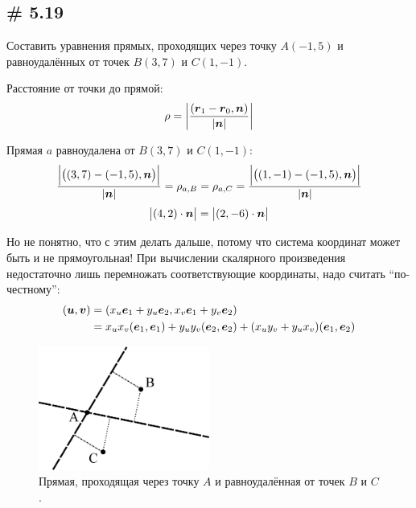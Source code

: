 \documentclass[a4paper,12pt]{article}
\begin{document}
  
  \subsection{\# 5.19}
  
  \begin{problem}
    Составить уравнения прямых, проходящих через точку $A(-1, 5)$ и равноудалённых от точек $B(3, 7)$ и $C(1, -1)$.
  \end{problem}
  
  \begin{solution}
    Расстояние от точки до прямой:
    \[
      \rho = \left|\frac{(\boldsymbol r_1 - \boldsymbol r_0, \boldsymbol n)}{|\boldsymbol n|}\right|
    \]
    
    Прямая $a$ равноудалена от $B(3, 7)$ и $C(1, -1)$:
    \[
      \frac{\Bigl|\bigl((3, 7) - (-1, 5), \boldsymbol n\bigr)\Bigr|}{|\boldsymbol n|} = \rho_{a, B}
      = \rho_{a, C}
      = \frac{\Bigl|\bigl((1, -1) - (-1, 5), \boldsymbol n\bigr)\Bigr|}{|\boldsymbol n|}
    \]
    \[
      \bigl|(4, 2) \cdot \boldsymbol n\bigr| = \bigl|(2, -6) \cdot \boldsymbol n\bigr|
    \]
    
    Но не понятно, что с этим делать дальше, потому что система координат может быть и не прямоугольная!
    При вычислении скалярного произведения недостаточно лишь перемножать соответствующие координаты, надо считать ``по-честному'':
    \begin{equation*}
    \begin{split}
      (\boldsymbol u, \boldsymbol v)
      &= (x_u \boldsymbol e_1 + y_u \boldsymbol e_2, x_v \boldsymbol e_1 + y_v \boldsymbol e_2)\\
      &= x_u x_v(\boldsymbol e_1, \boldsymbol e_1) + y_u y_v(\boldsymbol e_2, \boldsymbol e_2) + (x_u y_v + y_u x_v)(\boldsymbol e_1, \boldsymbol e_2)
    \end{split}
    \end{equation*}

    \begin{figure}[h]
      \centering
      
      \includegraphics[width=0.5\textwidth]{5-19}
      
      \caption{Прямая, проходящая через точку $A$ и равноудалённая от точек $B$ и $C$.}
      \label{fig:5-19}
    \end{figure}
    

\end{solution}
\end{document}
